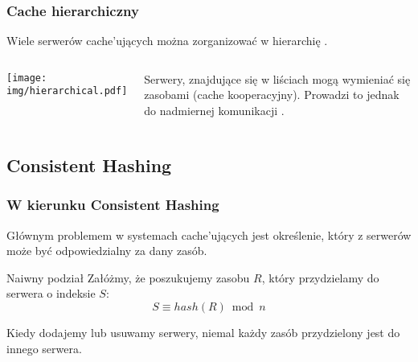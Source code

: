 \documentclass{beamer}
\begin{document}
\begin{frame}
\frametitle{Cache hierarchiczny}
\begin{block}{}
Wiele serwerów cache'ujących można zorganizować w hierarchię \citep{chankhunthod1995hierarchical}.
\end{block}

\begin{columns}[c]
\begin{center}
\texttt{[image: img/hierarchical.pdf]}
\end{center}

\pause
\begin{block}{}
Serwery, znajdujące się w liściach mogą wymieniać się zasobami (cache kooperacyjny). Prowadzi to jednak do nadmiernej komunikacji \citep{povey1997distributed, wolman1999scale}.
\end{block}

\end{columns}

\end{frame}

\subsection{Consistent Hashing}

\begin{frame}
\frametitle{W kierunku Consistent Hashing \citep{karger1997consistent}}
\begin{block}{}
Głównym problemem w systemach cache'ujących jest określenie, który z serwerów może być odpowiedzialny za dany zasób. 
\end{block}

\pause
\begin{block}{Naiwny podział}
Załóżmy, że poszukujemy zasobu $R$, który przydzielamy do serwera o indeksie $S$: 
\begin{equation*}
S \equiv hash(R) \bmod n
\end{equation*}
\end{block}

\pause
\begin{block}{}
Kiedy dodajemy lub usuwamy serwery, niemal każdy zasób przydzielony jest do innego serwera.
\end{block}

\end{frame}
\end{document}
